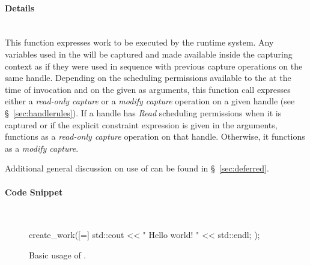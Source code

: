 \paragraph{Details}\mbox{}\\
This function expresses work to be executed by the \gls{runtime system}.  Any
 variables used in the  will be
captured and made available inside the capturing context as if they were used in
sequence with previous capture operations on the same \gls{handle}.  Depending on the
scheduling permissions available to the  at the time of
 invocation and on the 
given as arguments, this function call expresses either a {\it read-only
capture} or a {\it modify capture} operation on a given \gls{handle} (see
\S~\ref{sec:handlerules}).  If a \gls{handle}  has {\it Read} scheduling
permissions when it is captured or if the explicit constraint expression
 is given in the  arguments,
 functions as a {\it read-only capture} operation on that
\gls{handle}.
Otherwise, it functions as a {\it modify capture}.  

Additional general discussion on use of  can be found in
\S~\ref{sec:deferred}.


\paragraph{Code Snippet}\mbox{}\\
\begin{figure}[!h]
\begin{CppCodeNumb}
create_work([=]{
  std::cout << " Hello world! " << std::endl;
});
\end{CppCodeNumb}
\label{fig:fe_api_cw}
  \caption{Basic usage of \protect{}.}
\end{figure}


